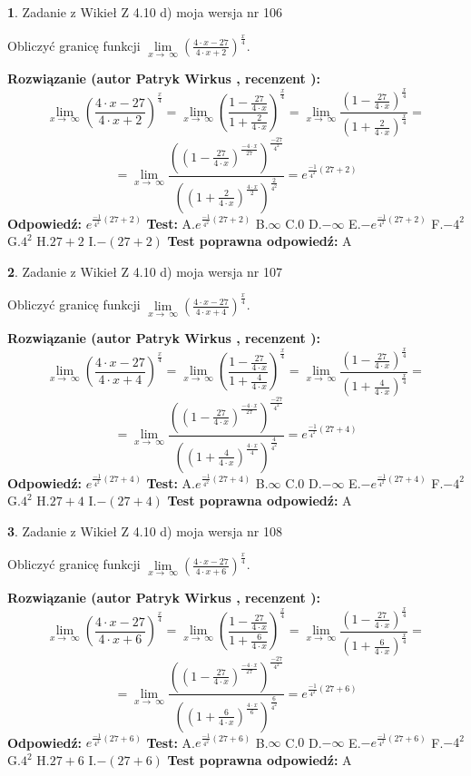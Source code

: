 \documentclass[12pt, a4paper]{article}
\theoremstyle{definition} %
\newtheorem{zad}{}
\newcommand{\zadStart}[1]{\begin{zad}#1\newline}
\newcommand{\zadStop}{\end{zad}}
\newcommand{\rozwStart}[2]{\noindent \textbf{Rozwiązanie (autor #1 , recenzent #2): }\newline}
\newcommand{\rozwStop}{\newline}
\newcommand{\odpStart}{\noindent \textbf{Odpowiedź:}\newline}
\newcommand{\odpStop}{\newline}
\newcommand{\testStart}{\noindent \textbf{Test:}\newline}
\newcommand{\testStop}{\newline}
\newcommand{\kluczStart}{\noindent \textbf{Test poprawna odpowiedź:}\newline}
\newcommand{\kluczStop}{\newline}
\begin{document}
\zadStart{Zadanie z Wikieł Z 4.10 d) moja wersja nr 106}


Obliczyć granicę funkcji  $\lim\limits_{x\to\ \infty}(\frac{4\cdot x-27}{4\cdot x+2})^{\frac{x}{4}}$.
\zadStop
\rozwStart{Patryk Wirkus}{}
$$\lim\limits_{x\to\ \infty}(\frac{4\cdot x-27}{4\cdot x+2})^{\frac{x}{4}} = \lim\limits_{x\to\ \infty}(\frac{1-\frac{27}{4\cdot x}}{1+\frac{2}{4\cdot x}})^{\frac{x}{4}}=\lim\limits_{x\to\ \infty}\frac{(1-\frac{27}{4\cdot x})^{\frac{x}{4}}}{(1+\frac{2}{4\cdot x})^{\frac{x}{4}}}=$$
$$=\lim\limits_{x\to\ \infty}\frac{((1-\frac{27}{4\cdot x})^{\frac{-4\cdot x}{27}})^{\frac{-27}{4^{2}}}}{((1+\frac{2}{4\cdot x})^{\frac{4\cdot x}{2}})^{\frac{2}{4^{2}}}}=e^{\frac{-1}{4^{2}}(27+2)}$$
\rozwStop
\odpStart
$e^{\frac{-1}{4^{2}}(27+2)}$
\odpStop
\testStart
A.$e^{\frac{-1}{4^{2}}(27+2)}$ B.$\infty$ C.$0$ D.$-\infty$ E.$-e^{\frac{-1}{4^{2}}(27+2)}$
F.$-4^{2}$ G.$4^{2}$
H.$27+2$
I.$-(27+2)$
\testStop
\kluczStart
A
\kluczStop



\zadStart{Zadanie z Wikieł Z 4.10 d) moja wersja nr 107}


Obliczyć granicę funkcji  $\lim\limits_{x\to\ \infty}(\frac{4\cdot x-27}{4\cdot x+4})^{\frac{x}{4}}$.
\zadStop
\rozwStart{Patryk Wirkus}{}
$$\lim\limits_{x\to\ \infty}(\frac{4\cdot x-27}{4\cdot x+4})^{\frac{x}{4}} = \lim\limits_{x\to\ \infty}(\frac{1-\frac{27}{4\cdot x}}{1+\frac{4}{4\cdot x}})^{\frac{x}{4}}=\lim\limits_{x\to\ \infty}\frac{(1-\frac{27}{4\cdot x})^{\frac{x}{4}}}{(1+\frac{4}{4\cdot x})^{\frac{x}{4}}}=$$
$$=\lim\limits_{x\to\ \infty}\frac{((1-\frac{27}{4\cdot x})^{\frac{-4\cdot x}{27}})^{\frac{-27}{4^{2}}}}{((1+\frac{4}{4\cdot x})^{\frac{4\cdot x}{4}})^{\frac{4}{4^{2}}}}=e^{\frac{-1}{4^{2}}(27+4)}$$
\rozwStop
\odpStart
$e^{\frac{-1}{4^{2}}(27+4)}$
\odpStop
\testStart
A.$e^{\frac{-1}{4^{2}}(27+4)}$ B.$\infty$ C.$0$ D.$-\infty$ E.$-e^{\frac{-1}{4^{2}}(27+4)}$
F.$-4^{2}$ G.$4^{2}$
H.$27+4$
I.$-(27+4)$
\testStop
\kluczStart
A
\kluczStop



\zadStart{Zadanie z Wikieł Z 4.10 d) moja wersja nr 108}


Obliczyć granicę funkcji  $\lim\limits_{x\to\ \infty}(\frac{4\cdot x-27}{4\cdot x+6})^{\frac{x}{4}}$.
\zadStop
\rozwStart{Patryk Wirkus}{}
$$\lim\limits_{x\to\ \infty}(\frac{4\cdot x-27}{4\cdot x+6})^{\frac{x}{4}} = \lim\limits_{x\to\ \infty}(\frac{1-\frac{27}{4\cdot x}}{1+\frac{6}{4\cdot x}})^{\frac{x}{4}}=\lim\limits_{x\to\ \infty}\frac{(1-\frac{27}{4\cdot x})^{\frac{x}{4}}}{(1+\frac{6}{4\cdot x})^{\frac{x}{4}}}=$$
$$=\lim\limits_{x\to\ \infty}\frac{((1-\frac{27}{4\cdot x})^{\frac{-4\cdot x}{27}})^{\frac{-27}{4^{2}}}}{((1+\frac{6}{4\cdot x})^{\frac{4\cdot x}{6}})^{\frac{6}{4^{2}}}}=e^{\frac{-1}{4^{2}}(27+6)}$$
\rozwStop
\odpStart
$e^{\frac{-1}{4^{2}}(27+6)}$
\odpStop
\testStart
A.$e^{\frac{-1}{4^{2}}(27+6)}$ B.$\infty$ C.$0$ D.$-\infty$ E.$-e^{\frac{-1}{4^{2}}(27+6)}$
F.$-4^{2}$ G.$4^{2}$
H.$27+6$
I.$-(27+6)$
\testStop
\kluczStart
A
\kluczStop
\end{document}
